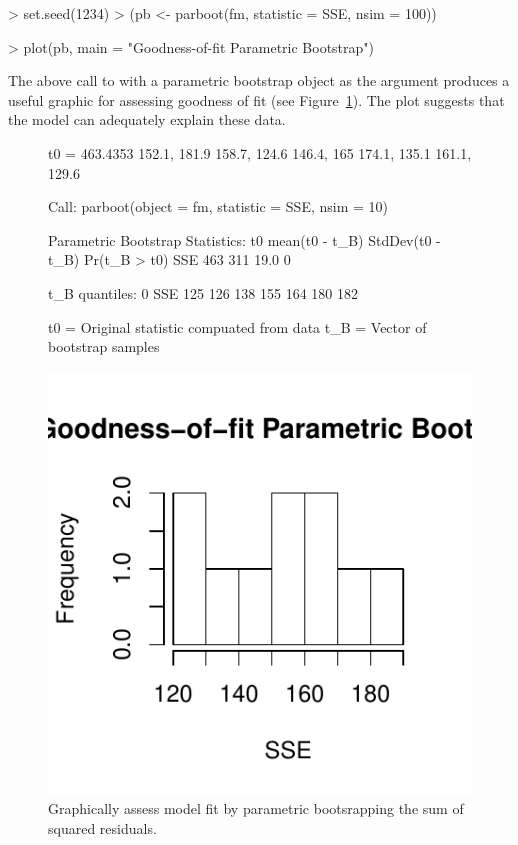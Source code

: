 \documentclass[article,shortnames]{jss}
\begin{document}
\begin{Schunk}
\begin{Sinput}
> set.seed(1234)
> (pb <- parboot(fm, statistic = SSE, nsim = 100))
\end{Sinput}
\end{Schunk}

\begin{Schunk}
\begin{Sinput}
> plot(pb, main = "Goodness-of-fit Parametric Bootstrap")
\end{Sinput}
\end{Schunk}

The above call to  with a parametric bootstrap object as
the argument produces a useful graphic for assessing goodness of fit
(see Figure~\ref{fig:pb}).  The plot suggests that the model can adequately
explain these data.

\begin{figure}
  \centering
\begin{Schunk}
\begin{Soutput}
t0 = 463.4353 
152.1, 181.9
158.7, 124.6
146.4, 165
174.1, 135.1
161.1, 129.6

Call: parboot(object = fm, statistic = SSE, nsim = 10)

Parametric Bootstrap Statistics:
     t0 mean(t0 - t_B) StdDev(t0 - t_B) Pr(t_B > t0)
SSE 463            311             19.0            0

t_B quantiles:
     0%
SSE 125  126 138 155 164   180  182

t0 = Original statistic compuated from data
t_B = Vector of bootstrap samples
\end{Soutput}
\end{Schunk}
\includegraphics{unmarked-028}
\caption{Graphically assess model fit by parametric bootsrapping
  the sum of squared residuals.}
\label{fig:pb}
\end{figure}
\end{document}
